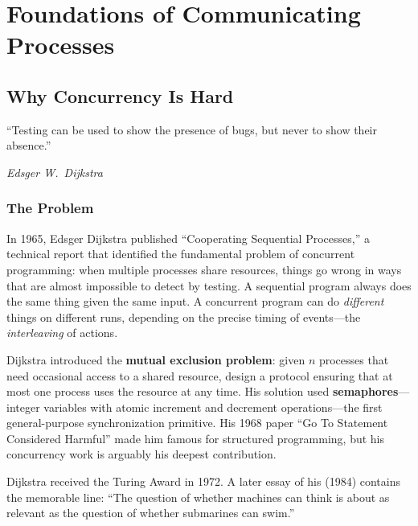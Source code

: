 \documentclass[11pt, a4paper, oneside]{book}
\begin{document}
\mainmatter
\color{black}

\part{Foundations of Communicating Processes}

\chapter{Why Concurrency Is Hard}

\epigraph{``Testing can be used to show the presence of bugs, but never to show
their absence.''}{\textit{Edsger W.\ Dijkstra}}

\section{The Problem}

\begin{historical}[title={Dijkstra and the Birth of Concurrency Theory}]
In 1965, Edsger Dijkstra published ``Cooperating Sequential Processes,'' a
technical report that identified the fundamental problem of concurrent
programming: when multiple processes share resources, things go wrong in ways
that are almost impossible to detect by testing. A sequential program always
does the same thing given the same input. A concurrent program can do
\emph{different} things on different runs, depending on the precise timing of
events---the \emph{interleaving} of actions.

Dijkstra introduced the \textbf{mutual exclusion problem}: given $n$ processes
that need occasional access to a shared resource, design a protocol ensuring
that at most one process uses the resource at any time. His solution used
\textbf{semaphores}---integer variables with atomic increment and decrement
operations---the first general-purpose synchronization primitive. His 1968
paper ``Go To Statement Considered Harmful'' made him famous for structured
programming, but his concurrency work is arguably his deepest contribution.

Dijkstra received the Turing Award in 1972. A later essay of his (1984)
contains the memorable line: ``The question of whether machines can think is about as
relevant as the question of whether submarines can swim.''
\end{historical}
\end{document}
